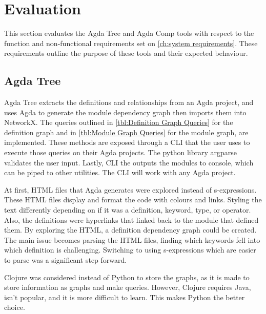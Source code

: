 
\chapter{Evaluation}

This section evaluates the Agda Tree and Agda Comp tools with respect to the
function and non-functional requirements set on \cref{ch:system requirements}. These requirements outline the purpose of these tools and their
expected behaviour.

\section{Agda Tree} \label{sec:eval agda tree}

Agda Tree extracts the definitions and relationships from an Agda project, and
uses Agda to generate the module dependency graph then imports them into
NetworkX. The queries outlined in \cref{tbl:Definition Graph Queries} for the
definition graph and in \cref{tbl:Module Graph Queries} for the module graph,
are implemented. These methods are exposed through a CLI
that the user uses to execute those queries on their Agda projects. The python
library argparse validates the user input. Lastly, CLI the outputs the modules to
console, which can be piped to other utilities. The CLI will work
with any Agda project.

At first, HTML files that Agda generates were explored instead of
s-expressions. These HTML files display and format the code with colours and
links. Styling the text differently depending on if it was a definition,
keyword, type, or operator. Also, the definitions were hyperlinks that linked
back to the module that defined them. By exploring the HTML, a definition
dependency graph could be created. The main issue becomes parsing the HTML
files, finding which keywords fell into which definition is challenging.
Switching to using s-expressions which are easier to parse was a significant
step forward.

Clojure was considered instead of Python to store the graphs, as it is made to
store information as graphs and make queries. However, Clojure requires Java,
isn't popular, and it is more difficult to learn. This makes Python the better
choice.

